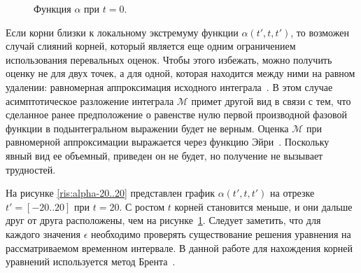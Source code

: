 \documentclass[14pt, a4paper]{article}
\numberwithin{figure}{section}
\numberwithin{equation}{section}
\newcommand{\cM}{\mathcal{M}}
\begin{document}
\begin{figure}[h]
	\caption{Функция $\alpha$ при $t = 0$.}
	\label{ris:alpha-20..0}
\end{figure}



Если корни близки к локальному экстремуму функции $\alpha(t', t, t')$, то возможен случай слияний корней, который является еще одним ограничением использования перевальных оценок.
Чтобы этого избежать, можно получить оценку не для двух точек, а для одной, которая находится между ними на равном удалении: равномерная аппроксимация исходного интеграла~\cite{Fedoryuk}.
В этом случае асимптотическое разложение интеграла $\cM$ примет другой вид в связи с тем, что сделанное ранее предположение о равенстве нулю первой производной фазовой функции в подынтегральном выражении будет не верным. Оценка $\cM$ при равномерной аппроксимации выражается через функцию Эйри~\cite{spec}. Поскольку явный вид ее объемный, приведен он не будет, но получение не вызывает трудностей.

На рисунке \ref{ris:alpha-20..20} представлен график $\alpha(t', t, t')$ на отрезке $t' = [-20..20]$ при $t = 20$. С ростом $t$ 
корней становится меньше, и они дальше друг от друга расположены, чем на рисунке~\ref{ris:alpha-20..0}. Следует заметить, что для каждого значения $\epsilon$ необходимо проверять существование решения уравнения на рассматриваемом временном интервале.
В данной работе для нахождения корней уравнений используется метод Брента~\cite{tarasevych}.
\end{document}
